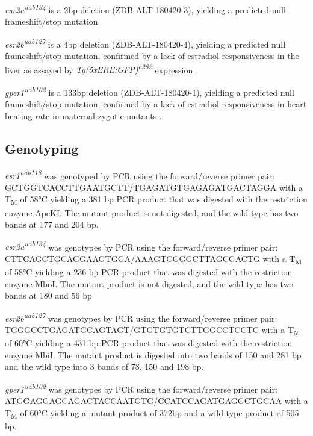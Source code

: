 \documentclass[9pt,lineno]{RandlettLab_elife}
\begin{document}
\emph{esr2a\textsuperscript{uab134}} is a 2bp deletion (ZDB-ALT-180420-3), yielding a predicted null frameshift/stop mutation \citep{Romano2017-ep}

\emph{esr2b\textsuperscript{uab127}} is a 4bp deletion (ZDB-ALT-180420-4), yielding a predicted null frameshift/stop mutation, confirmed by a lack of estradiol responsiveness in the liver as assayed by \emph{Tg(5xERE:GFP)\textsuperscript{c262}} expression \citep{Romano2017-ep}. 

\emph{gper1\textsuperscript{uab102}} is a 133bp deletion (ZDB-ALT-180420-1), yielding a predicted null frameshift/stop mutation, confirmed by a lack of estradiol responsiveness in heart beating rate in maternal-zygotic mutants \citep{Romano2017-ep}.

\subsection{Genotyping}

\emph{esr1\textsuperscript{uab118}} was genotyped by PCR using the forward/reverse primer pair:
\\ \mbox{GCTGGTCACCTTGAATGCTT/TGAGATGTGAGAGATGACTAGGA} with a T\textsubscript{M} of 58°C yielding a 381 bp PCR product that was digested with the restriction enzyme ApeKI. 
The mutant product is not digested, and the wild type has two bands at 177 and 204 bp.

\emph{esr2a\textsuperscript{uab134}} was genotypes by PCR using the forward/reverse primer pair:
\\ \mbox{CTTCAGCTGCAGGAAGTGGA/AAAGTCGGGCTTAGCGACTG} with a T\textsubscript{M} of 58°C yielding a 236 bp PCR product that was digested with the restriction enzyme MboI.
The mutant product is not digested, and the wild type has two bands at 180 and 56 bp 

\emph{esr2b\textsuperscript{uab127}} was genotypes by PCR using the forward/reverse primer pair:
\\ \mbox{TGGGCCTGAGATGCAGTAGT/GTGTGTGTCTTGGCCTCCTC} with a T\textsubscript{M} of 60°C yielding a 431 bp PCR product that was digested with the restriction enzyme MbiI.
The mutant product is digested into two bands of 150 and 281 bp and the wild type into 3 bands of 78, 150 and 198 bp. 

\emph{gper1\textsuperscript{uab102}} was genotypes by PCR using the forward/reverse primer pair:
\\ \mbox{ATGGAGGAGCAGACTACCAATGTG/CCATCCAGATGAGGCTGCAA} with a T\textsubscript{M} of 60°C yielding a mutant product of 372bp and a wild type product of 505 bp.
\end{document}
